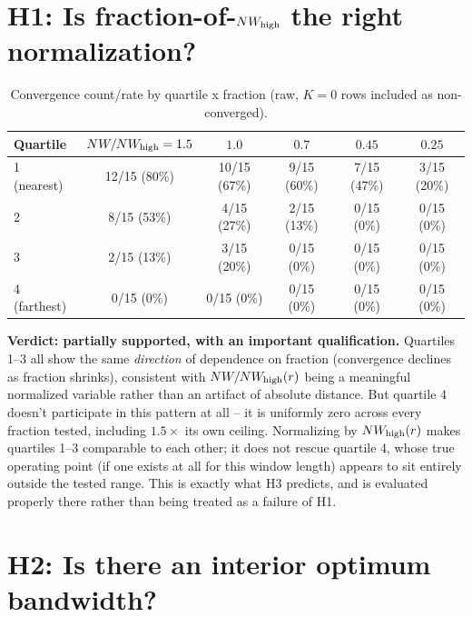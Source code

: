 \documentclass[11pt]{article}
\begin{document}
\section{H1: Is fraction-of-$NW_{\rm high}$ the right normalization?}

\begin{table}[h]
\centering
\begin{tabular}{lccccc}
\toprule
Quartile & $NW/NW_{\rm high}=1.5$ & $1.0$ & $0.7$ & $0.45$ & $0.25$ \\
\midrule
1 (nearest) & 12/15 (80\%) & 10/15 (67\%) & 9/15 (60\%) & 7/15 (47\%) & 3/15 (20\%) \\
2           & 8/15 (53\%)  & 4/15 (27\%)  & 2/15 (13\%) & 0/15 (0\%)  & 0/15 (0\%) \\
3           & 2/15 (13\%)  & 3/15 (20\%)  & 0/15 (0\%)  & 0/15 (0\%)  & 0/15 (0\%) \\
4 (farthest)& 0/15 (0\%)   & 0/15 (0\%)   & 0/15 (0\%)  & 0/15 (0\%)  & 0/15 (0\%) \\
\bottomrule
\end{tabular}
\caption{Convergence count/rate by quartile x fraction (raw, $K=0$ rows included as
non-converged).}
\label{tab:h1}
\end{table}

\textbf{Verdict: partially supported, with an important qualification.} Quartiles 1--3 all show
the same \emph{direction} of dependence on fraction (convergence declines as fraction shrinks),
consistent with $NW/NW_{\rm high}(r)$ being a meaningful normalized variable rather than an
artifact of absolute distance. But quartile 4 doesn't participate in this pattern at all -- it is
uniformly zero across every fraction tested, including $1.5\times$ its own ceiling. Normalizing
by $NW_{\rm high}(r)$ makes quartiles 1--3 comparable to each other; it does not rescue quartile
4, whose true operating point (if one exists at all for this window length) appears to sit
entirely outside the tested range. This is exactly what H3 predicts, and is evaluated properly
there rather than being treated as a failure of H1.

\section{H2: Is there an interior optimum bandwidth?}
\label{sec:h2}
\end{document}

